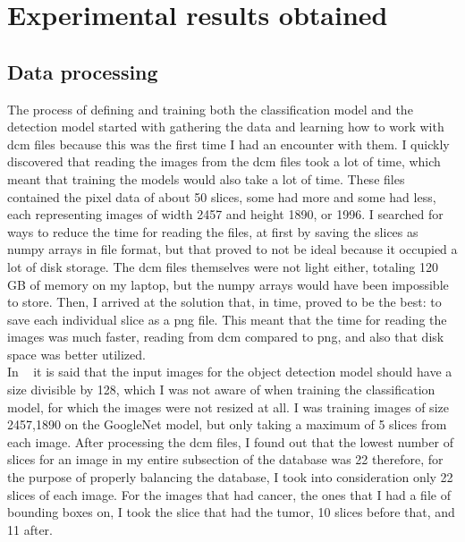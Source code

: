 \chapter{Experimental results obtained}
\section{Data processing}
The process of defining and training both the classification model and the detection model started with gathering the data and learning how to work with dcm files because this was the first time I had an encounter with them. I quickly discovered that reading the images from the dcm files took a lot of time, which meant that training the models would also take a lot of time. These files contained the pixel data of about 50 slices, some had more and some had less, each representing images of width 2457 and height 1890, or 1996. I searched for ways to reduce the time for reading the files, at first by saving the slices as numpy arrays in file format, but that proved to not be ideal because it occupied a lot of disk storage. The dcm files themselves were not light either, totaling 120 GB of memory on my laptop, but the numpy arrays would have been impossible to store. Then, I arrived at the solution that, in time, proved to be the best: to save each individual slice as a png file. This meant that the time for reading the images was much faster, reading from dcm compared to png, and also that disk space was better utilized.\\
In ~\cite{carte8} it is said that the input images for the object detection model should have a size divisible by 128, which I was not aware of when training the classification model, for which the images were not resized at all. I was training images of size 2457,1890 on the GoogleNet model, but only taking a maximum of 5 slices from each image. After processing the dcm files, I found out that the lowest number of slices for an image in my entire subsection of the database was 22 therefore, for the purpose of properly balancing the database, I took into consideration only 22 slices of each image. For the images that had cancer, the ones that I had a file of bounding boxes on, I took the slice that had the tumor, 10 slices before that, and 11 after.\\

